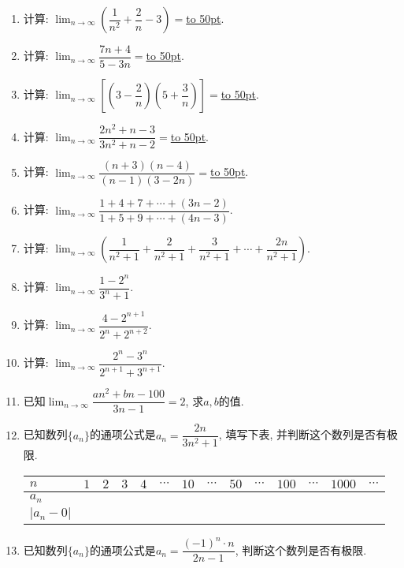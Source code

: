 \documentclass[10pt,a4paper]{article}
\newcommand{\blank}[1]{\underline{\hbox to #1pt{}}}
\begin{document}
\begin{enumerate}[1.]
\item 计算: $\displaystyle\lim_{n\to\infty}(\dfrac 1{n^2}+\dfrac 2n-3)=$\blank{50}.
\item 计算: $\displaystyle\lim_{n\to\infty}\dfrac{7n+4}{5-3n}=$\blank{50}.
\item 计算: $\displaystyle\lim_{n\to\infty}[(3-\dfrac 2n)(5+\dfrac 3n)]=$\blank{50}.
\item 计算: $\displaystyle\lim_{n\to\infty}\dfrac{2n^2+n-3}{3n^2+n-2}=$\blank{50}.
\item 计算: $\displaystyle\lim_{n\to\infty}\dfrac{(n+3)(n-4)}{(n-1)(3-2n)}=$\blank{50}.
\item 计算: $\displaystyle\lim_{n\to\infty}\dfrac{1+4+7+\cdots +(3n-2)}{1+5+9+\cdots +(4n-3)}$.
\item 计算: $\displaystyle\lim_{n\to\infty}(\dfrac 1{n^2+1}+\dfrac 2{n^2+1}+\dfrac 3{n^2+1}+\cdots +\dfrac{2n}{n^2+1})$.
\item 计算: $\displaystyle\lim_{n\to\infty}\dfrac{1-2^n}{3^n+1}$.
\item 计算: $\displaystyle\lim_{n\to\infty}\dfrac{4-2^{n+1}}{2^n+2^{n+2}}$.
\item 计算: $\displaystyle\lim_{n\to\infty}\dfrac{2^n-3^n}{2^{n+1}+3^{n+1}}$.
\item 已知$\displaystyle\lim_{n\to\infty}\dfrac{an^2+bn-100}{3n-1}=2$, 求$a,b$的值.
\item 已知数列$\{a_n\}$的通项公式是$a_n=\dfrac{2n}{3n^2+1}$, 填写下表, 并判断这个数列是否有极限.
\begin{center}
    \begin{tabular}{|p{}<{\centering}|p{}<{\centering}|p{}<{\centering}|p{}<{\centering}|p{}<{\centering}|p{}<{\centering}|p{}<{\centering}|p{}<{\centering}|p{}<{\centering}|p{}<{\centering}|p{}<{\centering}|p{}<{\centering}|p{}<{\centering}|p{}<{\centering}|}
        \hline
        $n$ & $1$ & $2$ & $3$ & $4$ & $\cdots$ & $10$ & $\cdots$ & $50$ & $\cdots$ & $100$ & $\cdots$ & $1000$ & $\cdots$ \\
        \hline    $a_n$  &&&&&&&&&&&&&\\ \hline
        $|a_n-0|$ &&&&&&&&&&&&&  \\ \hline  
    \end{tabular}
\end{center}										
\item 已知数列$\{a_n\}$的通项公式是$a_n=\dfrac{(-1)^n\cdot n}{2n-1}$, 判断这个数列是否有极限.

\end{enumerate}
\end{document}
